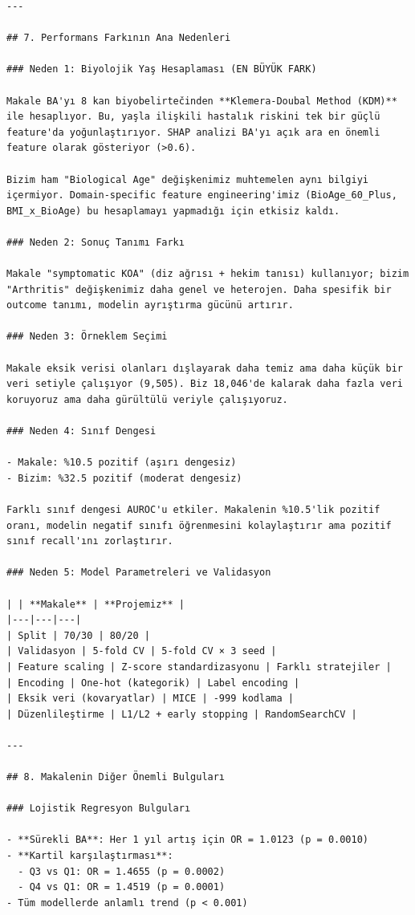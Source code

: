 ﻿\documentclass[11pt,a4paper]{article}
\begin{document}
\begin{verbatim}
---

## 7. Performans Farkının Ana Nedenleri

### Neden 1: Biyolojik Yaş Hesaplaması (EN BÜYÜK FARK)

Makale BA'yı 8 kan biyobelirtečinden **Klemera-Doubal Method (KDM)** ile hesaplıyor. Bu, yaşla ilişkili hastalık riskini tek bir güçlü feature'da yoğunlaştırıyor. SHAP analizi BA'yı açık ara en önemli feature olarak gösteriyor (>0.6).

Bizim ham "Biological Age" değişkenimiz muhtemelen aynı bilgiyi içermiyor. Domain-specific feature engineering'imiz (BioAge_60_Plus, BMI_x_BioAge) bu hesaplamayı yapmadığı için etkisiz kaldı.

### Neden 2: Sonuç Tanımı Farkı

Makale "symptomatic KOA" (diz ağrısı + hekim tanısı) kullanıyor; bizim "Arthritis" değişkenimiz daha genel ve heterojen. Daha spesifik bir outcome tanımı, modelin ayrıştırma gücünü artırır.

### Neden 3: Örneklem Seçimi

Makale eksik verisi olanları dışlayarak daha temiz ama daha küçük bir veri setiyle çalışıyor (9,505). Biz 18,046'de kalarak daha fazla veri koruyoruz ama daha gürültülü veriyle çalışıyoruz.

### Neden 4: Sınıf Dengesi

- Makale: %10.5 pozitif (aşırı dengesiz)
- Bizim: %32.5 pozitif (moderat dengesiz)

Farklı sınıf dengesi AUROC'u etkiler. Makalenin %10.5'lik pozitif oranı, modelin negatif sınıfı öğrenmesini kolaylaştırır ama pozitif sınıf recall'ını zorlaştırır.

### Neden 5: Model Parametreleri ve Validasyon

| | **Makale** | **Projemiz** |
|---|---|---|
| Split | 70/30 | 80/20 |
| Validasyon | 5-fold CV | 5-fold CV × 3 seed |
| Feature scaling | Z-score standardizasyonu | Farklı stratejiler |
| Encoding | One-hot (kategorik) | Label encoding |
| Eksik veri (kovaryatlar) | MICE | -999 kodlama |
| Düzenlileştirme | L1/L2 + early stopping | RandomSearchCV |

---

## 8. Makalenin Diğer Önemli Bulguları

### Lojistik Regresyon Bulguları

- **Sürekli BA**: Her 1 yıl artış için OR = 1.0123 (p = 0.0010)
- **Kartil karşılaştırması**:
  - Q3 vs Q1: OR = 1.4655 (p = 0.0002)
  - Q4 vs Q1: OR = 1.4519 (p = 0.0001)
- Tüm modellerde anlamlı trend (p < 0.001)


\end{verbatim}
\end{document}
